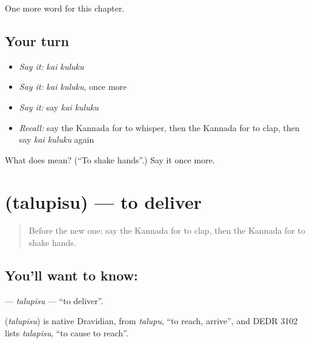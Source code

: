 \begin{grammarlens}[title={What you've built}]
One more word for this chapter.
\end{grammarlens}

\subsection*{Your turn}
\begin{itemize}
\raggedright
  \item \emph{Say it:} \emph{kai kuluku}
  \item \emph{Say it:} \emph{kai kuluku}, once more
  \item \emph{Say it:} say \emph{kai kuluku}
  \item \emph{Recall:} say the Kannada for to whisper, then the Kannada for to clap, then say \emph{kai kuluku} again
\end{itemize}

\begin{tcolorbox}[breakable,colback=teal!4,colframe=teal!35!black,title={Before you move on}]
What does   mean? (\textquotedblleft{}To shake hands\textquotedblright{}.) Say it once more.
\end{tcolorbox}
\section[\texorpdfstring{\kn{ತಲುಪಿಸು} (talupisu)}{ತಲುಪಿಸು (talupisu)}]{ (talupisu) — to deliver}

\label{lesson:KA-C280-talupisu}



\begin{quote}
Before the new one: say the Kannada for to clap, then the Kannada for to shake hands.
\end{quote}

\subsection*{You'll want to know: }
\textbf{} — \emph{talupisu} — \textquotedblleft{}to deliver\textquotedblright{}.

\begin{cousinweb}
\textbf{} (\emph{talupisu}) is native Dravidian, from \emph{talupu}, \textquotedblleft{}to reach, arrive\textquotedblright{}, and DEDR 3102 lists \emph{talapisu}, \textquotedblleft{}to cause to reach\textquotedblright{}.
\end{cousinweb}

